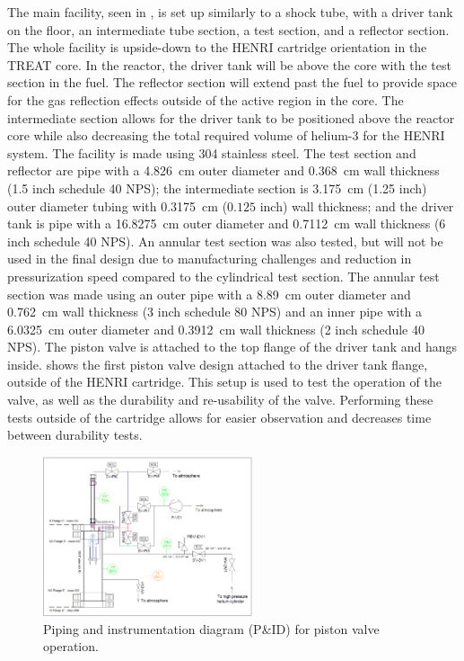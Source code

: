 The main facility, seen in , is set up similarly to a shock tube, with a driver tank on the floor, an intermediate tube section, a test section, and a reflector section.
The whole facility is upside-down to the HENRI cartridge orientation in the TREAT core.
In the reactor, the driver tank will be above the core with the test section in the fuel.
The reflector section will extend past the fuel to provide space for the gas reflection effects outside of the active region in the core.
The intermediate section allows for the driver tank to be positioned above the reactor core while also decreasing the total required volume of helium-3 for the HENRI system.
The facility is made using 304 stainless steel.
The test section and reflector are pipe with a \SI{4.826}{\centi\meter} outer diameter and \SI{0.368}{\centi\meter} wall thickness (1.5 inch schedule 40 NPS); the intermediate section is \SI{3.175}{\centi\meter} (1.25 inch) outer diameter tubing with \SI{0.3175}{\centi\meter} ($0.125$ inch) wall thickness; and the driver tank is pipe with a \SI{16.8275}{\centi\meter} outer diameter and \SI{0.7112}{\centi\meter} wall thickness (6 inch schedule 40 NPS).
An annular test section was also tested, but will not be used in the final design due to manufacturing challenges and reduction in pressurization speed compared to the cylindrical test section. The annular test section was made using an outer pipe with a \SI{8.89}{\centi\meter} outer diameter and \SI{0.762}{\centi\meter} wall thickness (3 inch schedule 80 NPS) and an inner pipe with a \SI{6.0325}{\centi\meter} outer diameter and \SI{0.3912}{\centi\meter} wall thickness (2 inch schedule 40 NPS).
The piston valve is attached to the top flange of the driver tank and hangs inside.  shows the first piston valve design attached to the driver tank flange, outside of the HENRI cartridge.
This setup is used to test the operation of the valve, as well as the durability and re-usability of the valve.
Performing these tests outside of the cartridge allows for easier observation and decreases time between durability tests.


%
\begin{figure}[tb]
    \vspace{16pt}
    \centering
    \includegraphics[width=0.55\textwidth]{experiment/photos/HENRI_valve_PID.PNG}
    \caption{Piping and instrumentation diagram (P\&ID) for piston valve operation.}
    \label{fig:sv pid}
    \vspace{16pt}
\end{figure}
%


